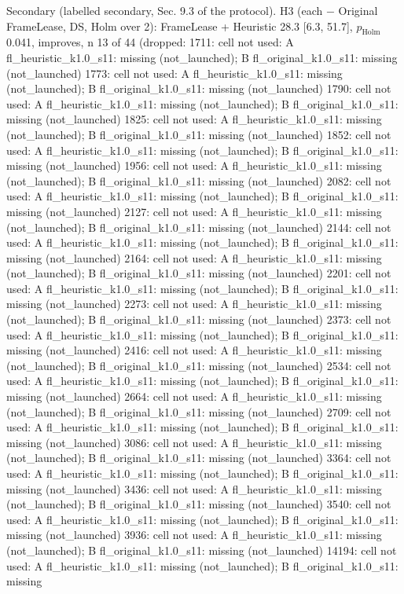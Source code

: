\begin{table}[t]
{Secondary (labelled secondary, Sec. 9.3 of the protocol). H3 (each $-$ Original FrameLease, DS, Holm over 2): FrameLease + Heuristic 28.3 [6.3, 51.7], $p_\mathrm{Holm}$ 0.041, improves, n 13 of 44 (dropped: 1711: cell not used: A fl\_heuristic\_k1.0\_s11: missing (not\_launched); B fl\_original\_k1.0\_s11: missing (not\_launched) \textbar{} 1773: cell not used: A fl\_heuristic\_k1.0\_s11: missing (not\_launched); B fl\_original\_k1.0\_s11: missing (not\_launched) \textbar{} 1790: cell not used: A fl\_heuristic\_k1.0\_s11: missing (not\_launched); B fl\_original\_k1.0\_s11: missing (not\_launched) \textbar{} 1825: cell not used: A fl\_heuristic\_k1.0\_s11: missing (not\_launched); B fl\_original\_k1.0\_s11: missing (not\_launched) \textbar{} 1852: cell not used: A fl\_heuristic\_k1.0\_s11: missing (not\_launched); B fl\_original\_k1.0\_s11: missing (not\_launched) \textbar{} 1956: cell not used: A fl\_heuristic\_k1.0\_s11: missing (not\_launched); B fl\_original\_k1.0\_s11: missing (not\_launched) \textbar{} 2082: cell not used: A fl\_heuristic\_k1.0\_s11: missing (not\_launched); B fl\_original\_k1.0\_s11: missing (not\_launched) \textbar{} 2127: cell not used: A fl\_heuristic\_k1.0\_s11: missing (not\_launched); B fl\_original\_k1.0\_s11: missing (not\_launched) \textbar{} 2144: cell not used: A fl\_heuristic\_k1.0\_s11: missing (not\_launched); B fl\_original\_k1.0\_s11: missing (not\_launched) \textbar{} 2164: cell not used: A fl\_heuristic\_k1.0\_s11: missing (not\_launched); B fl\_original\_k1.0\_s11: missing (not\_launched) \textbar{} 2201: cell not used: A fl\_heuristic\_k1.0\_s11: missing (not\_launched); B fl\_original\_k1.0\_s11: missing (not\_launched) \textbar{} 2273: cell not used: A fl\_heuristic\_k1.0\_s11: missing (not\_launched); B fl\_original\_k1.0\_s11: missing (not\_launched) \textbar{} 2373: cell not used: A fl\_heuristic\_k1.0\_s11: missing (not\_launched); B fl\_original\_k1.0\_s11: missing (not\_launched) \textbar{} 2416: cell not used: A fl\_heuristic\_k1.0\_s11: missing (not\_launched); B fl\_original\_k1.0\_s11: missing (not\_launched) \textbar{} 2534: cell not used: A fl\_heuristic\_k1.0\_s11: missing (not\_launched); B fl\_original\_k1.0\_s11: missing (not\_launched) \textbar{} 2664: cell not used: A fl\_heuristic\_k1.0\_s11: missing (not\_launched); B fl\_original\_k1.0\_s11: missing (not\_launched) \textbar{} 2709: cell not used: A fl\_heuristic\_k1.0\_s11: missing (not\_launched); B fl\_original\_k1.0\_s11: missing (not\_launched) \textbar{} 3086: cell not used: A fl\_heuristic\_k1.0\_s11: missing (not\_launched); B fl\_original\_k1.0\_s11: missing (not\_launched) \textbar{} 3364: cell not used: A fl\_heuristic\_k1.0\_s11: missing (not\_launched); B fl\_original\_k1.0\_s11: missing (not\_launched) \textbar{} 3436: cell not used: A fl\_heuristic\_k1.0\_s11: missing (not\_launched); B fl\_original\_k1.0\_s11: missing (not\_launched) \textbar{} 3540: cell not used: A fl\_heuristic\_k1.0\_s11: missing (not\_launched); B fl\_original\_k1.0\_s11: missing (not\_launched) \textbar{} 3936: cell not used: A fl\_heuristic\_k1.0\_s11: missing (not\_launched); B fl\_original\_k1.0\_s11: missing (not\_launched) \textbar{} 14194: cell not used: A fl\_heuristic\_k1.0\_s11: missing (not\_launched); B fl\_original\_k1.0\_s11: missing }
\end{table}
